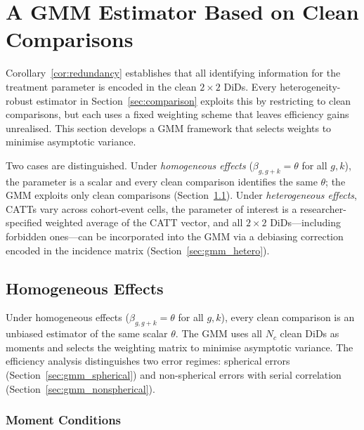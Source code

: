 \documentclass[12pt,letterpaper]{article}
\theoremstyle{remark}
\theoremstyle{definition}
\begin{document}
\section{A GMM Estimator Based on Clean Comparisons}
\label{sec:gmm}

Corollary~\ref{cor:redundancy} establishes that all identifying information
for the treatment parameter is encoded in the clean $2\times2$ DiDs. Every
heterogeneity-robust estimator in Section~\ref{sec:comparison} exploits this
by restricting to clean comparisons, but each uses a fixed weighting scheme
that leaves efficiency gains unrealised. This section develops a GMM framework
that selects weights to minimise asymptotic variance.

Two cases are distinguished. Under \emph{homogeneous effects}
($\beta_{g,g+k}=\theta$ for all $g,k$), the parameter is a scalar and every
clean comparison identifies the same $\theta$; the GMM exploits only clean
comparisons (Section~\ref{sec:gmm_homog}). Under \emph{heterogeneous effects},
CATTs vary across cohort-event cells, the parameter of interest is a
researcher-specified weighted average of the CATT vector, and all $2\times2$
DiDs---including forbidden ones---can be incorporated into the GMM via a
debiasing correction encoded in the incidence matrix
(Section~\ref{sec:gmm_hetero}).

\subsection{Homogeneous Effects}
\label{sec:gmm_homog}

Under homogeneous effects ($\beta_{g,g+k}=\theta$ for all $g,k$), every
clean comparison is an unbiased estimator of the same scalar $\theta$.
The GMM uses all $N_c$ clean DiDs as moments and selects the weighting
matrix to minimise asymptotic variance. The efficiency analysis
distinguishes two error regimes: spherical errors
(Section~\ref{sec:gmm_spherical}) and non-spherical errors with serial
correlation (Section~\ref{sec:gmm_nonspherical}).

\subsubsection{Moment Conditions}
\label{sec:gmm_moments}
\end{document}
